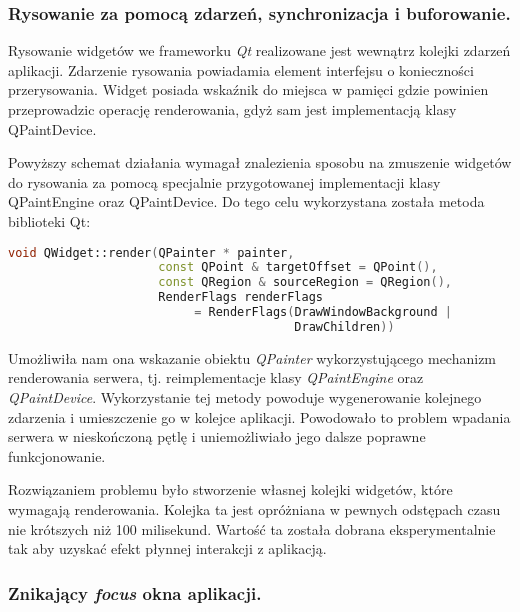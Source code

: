 \subsubsection{Rysowanie za pomocą zdarzeń, synchronizacja i buforowanie.}
\label{rendering_events}

Rysowanie widgetów we frameworku \emph{Qt} realizowane jest wewnątrz kolejki zdarzeń aplikacji. Zdarzenie rysowania powiadamia element interfejsu o konieczności przerysowania. Widget posiada wskaźnik do miejsca w pamięci gdzie powinien przeprowadzic operację renderowania, gdyż sam jest implementacją klasy QPaintDevice. 

Powyższy schemat działania wymagał znalezienia sposobu na zmuszenie widgetów do rysowania za pomocą specjalnie przygotowanej implementacji klasy QPaintEngine oraz QPaintDevice. Do tego celu wykorzystana została metoda biblioteki Qt:

\begin{lstlisting}[language=C++,numbers=none]
void QWidget::render(QPainter * painter, 
                     const QPoint & targetOffset = QPoint(), 
                     const QRegion & sourceRegion = QRegion(), 
                     RenderFlags renderFlags 
                          = RenderFlags(DrawWindowBackground | 
                                        DrawChildren))
\end{lstlisting}

Umożliwiła nam ona wskazanie obiektu \emph{QPainter} wykorzystującego mechanizm renderowania serwera, tj. reimplementacje klasy \emph{QPaintEngine} oraz \emph{QPaintDevice}. Wykorzystanie tej metody powoduje wygenerowanie kolejnego zdarzenia i umieszczenie go w kolejce aplikacji. Powodowało to problem wpadania serwera w nieskończoną pętlę i uniemożliwiało jego dalsze poprawne funkcjonowanie. 

Rozwiązaniem problemu było stworzenie własnej kolejki widgetów, które wymagają renderowania. Kolejka ta jest opróżniana w pewnych odstępach czasu nie krótszych niż 100 milisekund. Wartość ta została dobrana eksperymentalnie tak aby uzyskać efekt płynnej interakcji z aplikacją.

\subsubsection{Znikający \emph{focus} okna aplikacji.}
\label{problems_focus}

